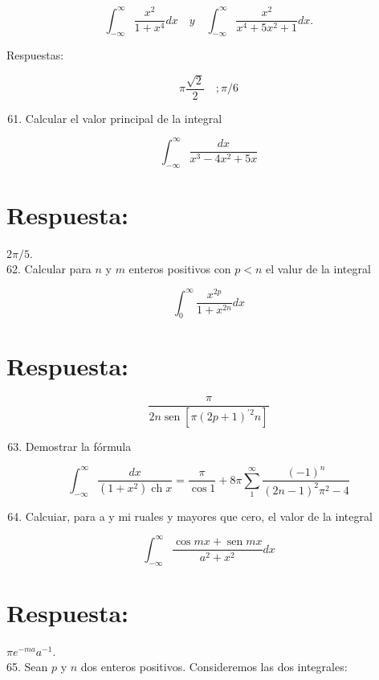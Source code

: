 \documentclass[10pt]{article}
\theoremstyle{plain}
\theoremstyle{definition}
\theoremstyle{remark}
\begin{document}
$$
\int_{-\infty}^{\infty} \frac{x^{2}}{1+x^{4}} d x \quad y \quad \int_{-\infty}^{\infty} \frac{x^{2}}{x^{4}+5 x^{2}+1} d x .
$$

Respuestas:

$$
\pi \frac{\sqrt{2}}{2} \quad ; \pi / 6
$$

\begin{enumerate}
  \setcounter{enumi}{60}
  \item Calcular el valor principal de la integral
\end{enumerate}

$$
\int_{-\infty}^{\infty} \frac{d x}{x^{3}-4 x^{2}+5 x}
$$


\section*{Respuesta:}
$2 \pi / 5$.\\
62. Calcular para $n$ y $m$ enteros positivos con $p<n$ el valur de la integral

$$
\int_{0}^{\infty} \frac{x^{2 p}}{1+x^{2 n}} d x
$$

\section*{Respuesta:}
$$
\frac{\pi}{2 n \operatorname{sen}\left[\pi(2 p+1)^{\prime 2} n\right]}
$$

\begin{enumerate}
  \setcounter{enumi}{62}
  \item Demostrar la fórmula
\end{enumerate}

$$
\int_{-\infty}^{\infty} \frac{d x}{\left(1+x^{2}\right) \operatorname{ch} x}=\frac{\pi}{\cos 1}+8 \pi \sum_{1}^{\infty} \frac{(-1)^{n}}{(2 n-1)^{2} \pi^{2}-4}
$$

\begin{enumerate}
  \setcounter{enumi}{63}
  \item Calcuiar, para a y mi ruales y mayores que cero, el valor de la integral
\end{enumerate}

$$
\int_{-\infty}^{\infty} \frac{\cos m x+\operatorname{sen} m x}{a^{2}+x^{2}} d x
$$

\section*{Respuesta:}
$\pi e^{-m a} a^{-1}$.\\
65. Sean $p$ y $n$ dos enteros positivos. Consideremos las dos integrales:
\end{document}
